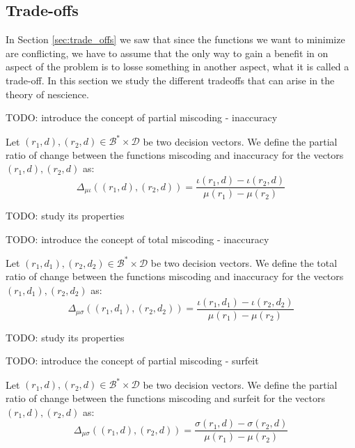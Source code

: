 
\subsection*{Trade-offs}

In Section \ref{sec:trade_offs} we saw that since the functions we want to minimize are conflicting, we have to assume that the only way to gain a benefit in on aspect of the problem is to losse something in another aspect, what it is called a trade-off. In this section we study the different tradeoffs that can arise in the theory of nescience.

{\color{red} TODO: introduce the concept of partial miscoding - inaccuracy}

\begin{definition}
Let $(r_1, d), (r_2, d) \in \mathcal{B}^\ast \times \mathcal{D}$ be two decision vectors. We define the partial ratio of change between the functions miscoding and inaccuracy for the vectors $(r_1, d), (r_2, d)$ as:
\[
\Delta_{\mu \iota} \left( (r_1, d), (r_2, d) \right) = \frac{ \iota(r_1, d) - \iota(r_2, d) }{ \mu(r_1) - \mu(r_2) }
\] 
\end{definition}

{\color{red} TODO: study its properties}

{\color{red} TODO: introduce the concept of total miscoding - inaccuracy}

\begin{definition}
Let $(r_1, d_1), (r_2, d_2) \in \mathcal{B}^\ast \times \mathcal{D}$ be two decision vectors. We define the total ratio of change between the functions miscoding and inaccuracy for the vectors $(r_1, d_1), (r_2, d_2)$ as:
\[
\Delta_{\mu \sigma} \left( (r_1, d_1), (r_2, d_2) \right) = \frac{ \iota(r_1, d_1) - \iota(r_2, d_2) }{ \mu(r_1) - \mu(r_2) }
\] 
\end{definition}

{\color{red} TODO: study its properties}

{\color{red} TODO: introduce the concept of partial miscoding - surfeit}

\begin{definition}
Let $(r_1, d), (r_2, d) \in \mathcal{B}^\ast \times \mathcal{D}$ be two decision vectors. We define the partial ratio of change between the functions miscoding and surfeit for the vectors $(r_1, d), (r_2, d)$ as:
\[
\Delta_{\mu \sigma} \left( (r_1, d), (r_2, d) \right) = \frac{ \sigma(r_1, d) - \sigma(r_2, d) }{ \mu(r_1) - \mu(r_2) }
\] 
\end{definition}

